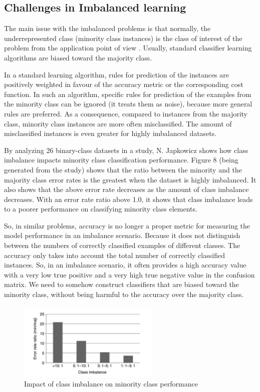 \subsection{Challenges in Imbalanced learning}
The main issue with the imbalanced problems is that normally, the underrepresented class 
(minority class instances) is the class of interest of the problem from the application point of 
view \cite{chawla_automatically_2008}. Usually, standard classifier learning algorithms are biased 
toward the majority class. 

In a standard learning algorithm, rules for prediction of the instances are positively weighted in 
favour of the accuracy metric or the corresponding cost function. In such an algorithm, specific 
rules for prediction of the examples from the minority class can be ignored (it treats them as noise), 
because more general rules are preferred. As a consequence, compared to instances from the majority 
class, minority class instances are more often misclassified. The amount of misclassified instances 
is even greater for highly imbalanced datasets.

By analyzing 26 binary-class datasets in a study, N. Japkowicz \cite{japkowicz_concept-learning_2001} 
shows how class imbalance impacts minority class classification performance. Figure 8 (being generated 
from the study) shows that the ratio between the minority and the majority class error rates is the 
greatest when the dataset is highly imbalanced. It also shows that the above error rate decreases as 
the amount of class imbalance decreases. With an error rate ratio above 1.0, it shows that class 
imbalance leads to a poorer performance on classifying minority class elements.

So, in similar problems, accuracy is no longer a proper metric for measuring the model performance 
in an imbalance scenario. Because it does not distinguish between the numbers of correctly classified 
examples of different classes. The accuracy only takes into account the total number of correctly 
classified instances. So, in an imbalance scenario, it often provides a high accuracy value with a 
very low true positive and a very high true negative value in the confusion matrix. We need to 
somehow construct classifiers that are biased toward the minority class, without being harmful 
to the accuracy over the majority class.

\begin{figure}[ht]
    \centering
    \includegraphics[width=0.60\textwidth]{figures/08errorRate.png}
    \caption{Impact of class imbalance on minority class performance \cite{japkowicz_concept-learning_2001}}
    \label{fig:errorRate}
\end{figure}

